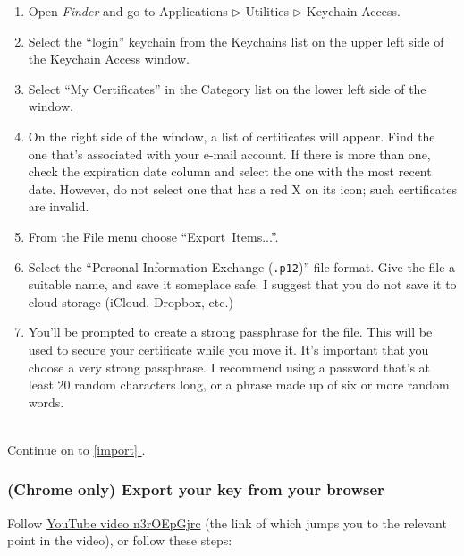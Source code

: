 \documentclass[pdftex,12pt,titlepage=false]{scrartcl}
\newcommand*{\fullref}[1]{\hyperref[{#1}]{\autoref*{#1} \nameref*{#1}}}
\begin{document}
\begin{minipage}{\textwidth}%
  \begin{multicols}{2}
    \begin{enumerate}
    \item Open \emph{Finder} and go to Applications $\triangleright$
      Utilities $\triangleright$ Keychain Access.
    \item Select the ``login'' keychain from the Keychains list on the
      upper left side of the Keychain Access window.
    \item Select ``My Certificates'' in the Category list on the lower
      left side of the window.
    \item On the right side of the window, a list of certificates will
      appear. Find the one that’s associated with your e-mail
      account. If there is more than one, check the expiration date
      column and select the one with the most recent date. However, do
      not select one that has a red X on its icon; such certificates
      are invalid.
    \item From the File menu choose ``Export~Items...''.
    \item Select the ``Personal Information Exchange (\texttt{.p12})''
      file format. Give the file a suitable name, and save it
      someplace safe. I suggest that you do not save it to cloud
      storage (iCloud, Dropbox, etc.)
    \item You'll be prompted to create a strong passphrase for the
      file. This will be used to secure your certificate while you
      move it. It's important that you choose a very strong
      passphrase. I recommend using a password that's at least 20
      random characters long, or a phrase made up of six or more
      random words.
    \end{enumerate}
  \end{multicols}
\end{minipage}\\[1em]

Continue on to \fullref{import}.

\subsubsection{(Chrome only) Export your key from your browser}
Follow \href{https://www.youtube.com/watch?v=n3rOEpGjrc\&start=310}{%
  YouTube video n3rOEpGjrc} (the link of which jumps you to the
relevant point in the video), or follow these steps:
\end{document}
